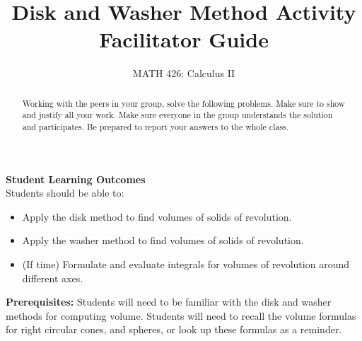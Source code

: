 \documentclass{ximera}
\title{Disk and Washer Method Activity Facilitator Guide}
\author{MATH 426: Calculus II}
\begin{document}
\begin{abstract}
   Working with the peers in your group, solve the following problems. Make sure to show and justify all your work. Make sure everyone in the group understands the solution and participates. Be prepared to report your answers to the whole class. 
\end{abstract}
\maketitle

\textbf{Student Learning Outcomes}\\
Students should be able to:\\
    \begin{itemize}
        \item Apply the disk method to find volumes of solids of revolution.
        \item Apply the washer method to find volumes of solids of revolution.
        \item (If time) Formulate and evaluate integrals for volumes of revolution around different axes.
    \end{itemize}

\textbf{Prerequisites:} Students will need to be familiar with the disk and washer methods for computing volume. Students will need to recall the volume formulas for right circular cones, and spheres, or look up these formulas as a reminder.
\end{document}
